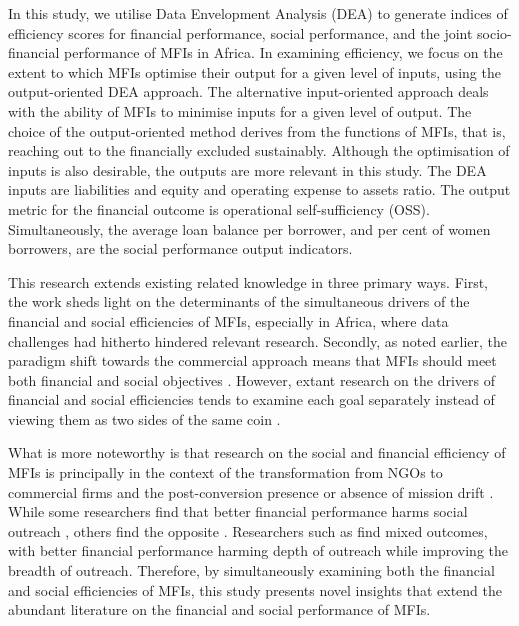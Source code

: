 \documentclass[a4paper, nobind]{templates/ociamthesis}
\begin{document}
In this study, we utilise Data Envelopment Analysis (DEA) to generate indices of efficiency scores for financial performance, social performance, and the joint socio-financial performance of MFIs in Africa. In examining efficiency, we focus on the extent to which MFIs optimise their output for a given level of inputs, using the output-oriented DEA approach. The alternative input-oriented approach deals with the ability of MFIs to minimise inputs for a given level of output. The choice of the output-oriented method derives from the functions of MFIs, that is, reaching out to the financially excluded sustainably. Although the optimisation of inputs is also desirable, the outputs are more relevant in this study. The DEA inputs are liabilities and equity and operating expense to assets ratio. The output metric for the financial outcome is operational self-sufficiency (OSS). Simultaneously, the average loan balance per borrower, and per cent of women borrowers, are the social performance output indicators.

This research extends existing related knowledge in three primary ways. First, the work sheds light on the determinants of the simultaneous drivers of the financial and social efficiencies of MFIs, especially in Africa, where data challenges had hitherto hindered relevant research. Secondly, as noted earlier, the paradigm shift towards the commercial approach means that MFIs should meet both financial and social objectives \autocite{d2017ngos,chahine2010social}. However, extant research on the drivers of financial and social efficiencies tends to examine each goal separately instead of viewing them as two sides of the same coin \autocite{efendic2017social,gutierrez2009social}.

What is more noteworthy is that research on the social and financial efficiency of MFIs is principally in the context of the transformation from NGOs to commercial firms and the post-conversion presence or absence of mission drift \autocite{wassie2019performance,d2017ngos,mersland2009performance,mia2017mission,ramus2017}. While some researchers find that better financial performance harms social outreach \autocite{tina2002institutional,kent2013bankers}, others find the opposite \autocite{kar2018changes,abeysekera2014sustainability}. Researchers such as \textcite{leite2019profit} find mixed outcomes, with better financial performance harming depth of outreach while improving the breadth of outreach. Therefore, by simultaneously examining both the financial and social efficiencies of MFIs, this study presents novel insights that extend the abundant literature on the financial and social performance of MFIs.
\end{document}
